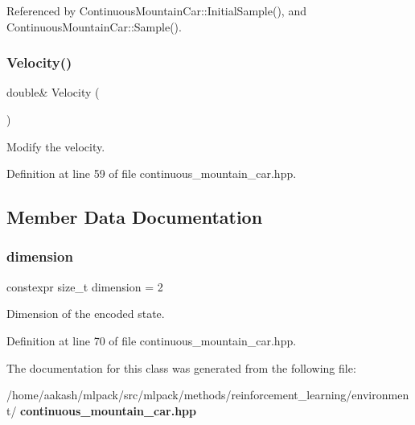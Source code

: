 Referenced by Continuous\+Mountain\+Car\+::\+Initial\+Sample(), and Continuous\+Mountain\+Car\+::\+Sample().

\mbox{\label{classmlpack_1_1rl_1_1ContinuousMountainCar_1_1State_a2bdce16cfc8c84b65f13ee9fffab1266}} 
\subsubsection{Velocity()\hspace{0.1cm}{\footnotesize\ttfamily [2/2]}}
{\footnotesize\ttfamily double\& Velocity (\begin{DoxyParamCaption}{ }\end{DoxyParamCaption})\hspace{0.3cm}{\ttfamily [inline]}}



Modify the velocity. 



Definition at line 59 of file continuous\+\_\+mountain\+\_\+car.\+hpp.



\subsection{Member Data Documentation}
\mbox{\label{classmlpack_1_1rl_1_1ContinuousMountainCar_1_1State_ae813298f34ef9d793885fc04b54dff99}} 
\subsubsection{dimension}
{\footnotesize\ttfamily constexpr size\+\_\+t dimension = 2\hspace{0.3cm}{\ttfamily [static]}}



Dimension of the encoded state. 



Definition at line 70 of file continuous\+\_\+mountain\+\_\+car.\+hpp.



The documentation for this class was generated from the following file\+:\begin{DoxyCompactItemize}
\item 
/home/aakash/mlpack/src/mlpack/methods/reinforcement\+\_\+learning/environment/\textbf{ continuous\+\_\+mountain\+\_\+car.\+hpp}\end{DoxyCompactItemize}
